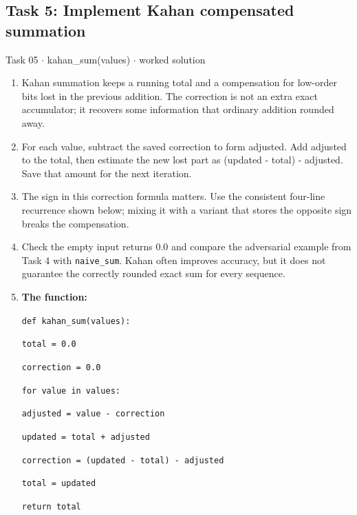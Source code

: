 \documentclass[11pt]{article}
\begin{document}
\begin{keepsection}\subsection{Task 5: Implement Kahan compensated summation}

\begin{workedbox}{Task 05 \ensuremath{\cdot} kahan\_sum(values) \ensuremath{\cdot} worked solution}
\begin{enumerate}
\item Kahan summation keeps a running total and a compensation for low-order bits lost in the previous addition. The correction is not an extra exact accumulator; it recovers some information that ordinary addition rounded away.
\item For each value, subtract the saved correction to form adjusted. Add adjusted to the total, then estimate the new lost part as (updated - total) - adjusted. Save that amount for the next iteration.
\item The sign in this correction formula matters. Use the consistent four-line recurrence shown below; mixing it with a variant that stores the opposite sign breaks the compensation.
\item Check the empty input returns 0.0 and compare the adversarial example from Task 4 with \texttt{naive\_sum}. Kahan often improves accuracy, but it does not guarantee the correctly rounded exact sum for every sequence.
\item {}
\textbf{The function:}
\begin{tcolorbox}[colback=Paperblue,colframe=Paperblue,boxrule=0pt,arc=0pt,left=7pt,right=7pt,top=5pt,bottom=5pt]\small\sloppy
\noindent\hspace*{0em}\texttt{def kahan\_sum(values):}\par
\noindent\hspace*{1em}\texttt{total = 0.0}\par
\noindent\hspace*{1em}\texttt{correction = 0.0}\par
\noindent\hspace*{1em}\texttt{for value in values:}\par
\noindent\hspace*{3em}\texttt{adjusted = value - correction}\par
\noindent\hspace*{3em}\texttt{updated = total + adjusted}\par
\noindent\hspace*{3em}\texttt{correction = (updated - total) - adjusted}\par
\noindent\hspace*{3em}\texttt{total = updated}\par
\noindent\hspace*{1em}\texttt{return total}\par
\end{tcolorbox}
\end{enumerate}
\end{workedbox}

\end{keepsection}
\end{document}
